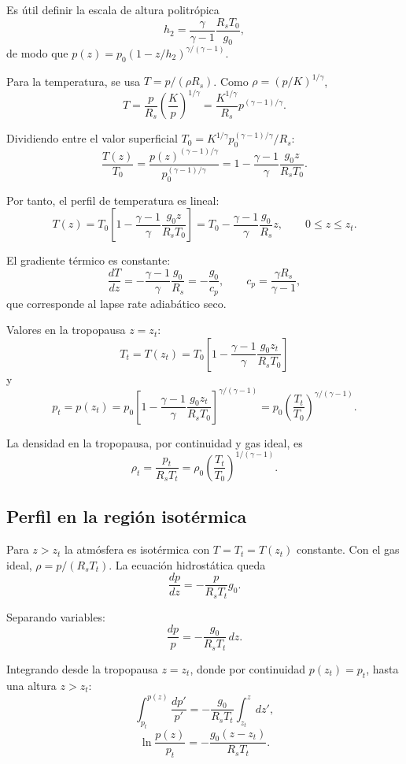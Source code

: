 \documentclass[11pt,a4paper]{article}
\begin{document}
Es útil definir la escala de altura politrópica
\[
h_{2}=\frac{\gamma}{\gamma-1}\frac{R_{s}T_{0}}{g_{0}},
\]
de modo que $p(z)=p_{0}(1-z/h_{2})^{\gamma/(\gamma-1)}$.

Para la temperatura, se usa $T=p/(\rho R_{s})$. Como $\rho=(p/K)^{1/\gamma}$,
\[
T=\frac{p}{R_{s}}\left(\frac{K}{p}\right)^{1/\gamma}
=\frac{K^{1/\gamma}}{R_{s}}p^{(\gamma-1)/\gamma}.
\]

Dividiendo entre el valor superficial $T_{0}=K^{1/\gamma}p_{0}^{(\gamma-1)/\gamma}/R_{s}$:
\[
\frac{T(z)}{T_{0}}=\frac{p(z)^{(\gamma-1)/\gamma}}{p_{0}^{(\gamma-1)/\gamma}}
=1-\frac{\gamma-1}{\gamma}\frac{g_{0}z}{R_{s}T_{0}}.
\]

Por tanto, el perfil de temperatura es lineal:
\[
\boxed{\,T(z)=T_{0}\left[1-\frac{\gamma-1}{\gamma}\frac{g_{0}z}{R_{s}T_{0}}\right]
=T_{0}-\frac{\gamma-1}{\gamma}\frac{g_{0}}{R_{s}}z,\qquad 0\le z\le z_{t}.\,}
\]

El gradiente térmico es constante:
\[
\frac{dT}{dz}=-\frac{\gamma-1}{\gamma}\frac{g_{0}}{R_{s}}=-\frac{g_{0}}{c_{p}},
\qquad c_{p}=\frac{\gamma R_{s}}{\gamma-1},
\]
que corresponde al lapse rate adiabático seco.

Valores en la tropopausa $z=z_{t}$:
\[
\boxed{\,T_{t}=T(z_{t})=T_{0}\left[1-\frac{\gamma-1}{\gamma}\frac{g_{0}z_{t}}{R_{s}T_{0}}\right]\,}
\]
y
\[
\boxed{\,p_{t}=p(z_{t})
=p_{0}\left[1-\frac{\gamma-1}{\gamma}\frac{g_{0}z_{t}}{R_{s}T_{0}}\right]^{\gamma/(\gamma-1)}
=p_{0}\left(\frac{T_{t}}{T_{0}}\right)^{\gamma/(\gamma-1)}.\,}
\]

La densidad en la tropopausa, por continuidad y gas ideal, es
\[
\rho_{t}=\frac{p_{t}}{R_{s}T_{t}}=\rho_{0}\left(\frac{T_{t}}{T_{0}}\right)^{1/(\gamma-1)}.
\]

\subsection{Perfil en la región isotérmica}

Para $z>z_{t}$ la atmósfera es isotérmica con $T=T_{t}=T(z_{t})$ constante.
Con el gas ideal, $\rho=p/(R_{s}T_{t})$. La ecuación hidrostática queda
\[
\frac{dp}{dz}=-\frac{p}{R_{s}T_{t}}g_{0}.
\]

Separando variables:
\[
\frac{dp}{p}=-\frac{g_{0}}{R_{s}T_{t}}\,dz.
\]

Integrando desde la tropopausa $z=z_{t}$, donde por continuidad $p(z_{t})=p_{t}$, hasta una altura $z>z_{t}$:
\[
\int_{p_{t}}^{p(z)}\frac{dp'}{p'}
=-\frac{g_{0}}{R_{s}T_{t}}\int_{z_{t}}^{z}dz',
\]
\[
\ln\frac{p(z)}{p_{t}}=-\frac{g_{0}(z-z_{t})}{R_{s}T_{t}}.
\]
\end{document}
